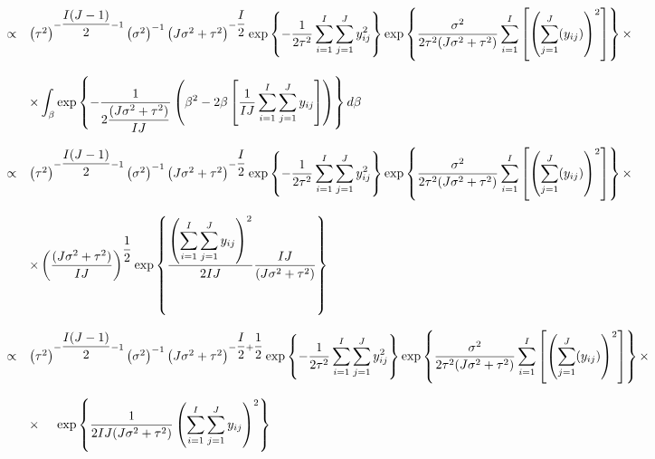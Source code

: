\documentclass{article}
\begin{document}
\begin{equation*}
\begin{array}{lcl ll }

& \propto & \left(\tau^2\right)^{-\dfrac{I(J-1)}{2} -1} \left(\sigma^2\right)^{-1} \left(J\sigma^2 + \tau^2\right)^{-\dfrac{I}{2}} \mbox{exp}\left\{ - \dfrac{1}{2\tau^2}\displaystyle\sum_{i=1}^{I}\sum_{j=1}^{J} y_{ij}^2 \right\} \mbox{exp}\left\{ \dfrac{\sigma^2}{2\tau^2(J\sigma^2 + \tau^2)}\displaystyle\sum_{i=1}^{I}\left[\left(\sum_{j=1}^{J} (y_{ij})\right)^2 \right] \right\} \times \\ \\

& & \times
\displaystyle\int_{\beta} \mbox{exp}\left\{ - \dfrac{1}{2\dfrac{(J\sigma^2 + \tau^2)}{IJ}}\left(\beta^2 - 2\beta\left[\dfrac{1}{IJ}\displaystyle\sum_{i=1}^{I}\sum_{j=1}^{J}y_{ij} \right] \right)\right\} d\beta\\\\

& \propto & \left(\tau^2\right)^{-\dfrac{I(J-1)}{2} -1} \left(\sigma^2\right)^{-1} \left(J\sigma^2 + \tau^2\right)^{-\dfrac{I}{2}} \mbox{exp}\left\{ - \dfrac{1}{2\tau^2}\displaystyle\sum_{i=1}^{I}\sum_{j=1}^{J} y_{ij}^2 \right\} \mbox{exp}\left\{ \dfrac{\sigma^2}{2\tau^2(J\sigma^2 + \tau^2)}\displaystyle\sum_{i=1}^{I}\left[\left(\sum_{j=1}^{J} (y_{ij})\right)^2 \right] \right\} \times \\ \\

& & \times
\left(\dfrac{(J\sigma^2 + \tau^2)}{IJ}\right)^{\dfrac{1}{2}}\mbox{exp}\left\{\dfrac{\left(\displaystyle\sum_{i=1}^{I}\sum_{j=1}^{J}y_{ij}\right)^2}{2IJ} \dfrac{IJ}{(J\sigma^2 + \tau^2)} \right\} \\\\

& \propto & \left(\tau^2\right)^{-\dfrac{I(J-1)}{2} -1} \left(\sigma^2\right)^{-1} \left(J\sigma^2 + \tau^2\right)^{-\dfrac{I}{2} + \dfrac{1}{2}} \mbox{exp}\left\{ - \dfrac{1}{2\tau^2}\displaystyle\sum_{i=1}^{I}\sum_{j=1}^{J} y_{ij}^2 \right\} \mbox{exp}\left\{ \dfrac{\sigma^2}{2\tau^2(J\sigma^2 + \tau^2)}\displaystyle\sum_{i=1}^{I}\left[\left(\sum_{j=1}^{J} (y_{ij})\right)^2 \right] \right\} \times \\ \\

& & \times
\hspace{0.5cm} \mbox{exp}\left\{\dfrac{1}{2IJ(J\sigma^2 + \tau^2)}\left(\displaystyle\sum_{i=1}^{I}\sum_{j=1}^{J}y_{ij}\right)^2 \right\} \\\\

 \end{array}
\end{equation*}
\end{document}
